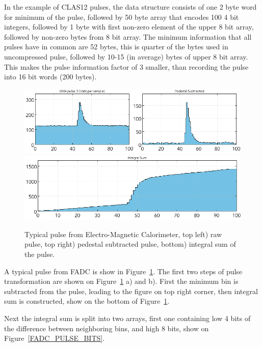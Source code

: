 \documentclass[12pt]{article}
\begin{document}
In the example of CLAS12 pulses, the data structure consists of one 2 byte word for
minimum of the pulse, followed by 50 byte array that encodes 100 4 bit integers, followed
by 1 byte with first non-zero element of the upper 8 bit array, followed by non-zero bytes
from 8 bit array. The minimum information that all pulses have in common are 52 bytes,
this is quarter of the bytes used in uncompressed pulse, followed by 10-15 (in average)
bytes of upper 8 bit array. This makes the pulse information factor of 3 smaller, than 
recording the pulse into 16 bit words (200 bytes).



\begin{figure}[!ht]
\begin{center}

 \includegraphics[width=6in]{pics/fadc_pulse_reduction.png}
 \includegraphics[width=6in]{pics/fadc_pulse_summ.png}

 \caption {Typical pulse from Electro-Magnetic Calorimeter, top left) raw pulse, top right) pedestal subtracted pulse, bottom) integral sum of the pulse.}
 \label{FADC_PULSE}
 \end{center}
\end{figure}

A typical pulse from FADC is show in Figure~\ref{FADC_PULSE}. The first two steps of
pulse transformation are shown on Figure~\ref{FADC_PULSE} a) and b). First the minimum
bin is subtracted from the pulse, leading to the figure on top right corner, then integral sum
is constructed, show on the bottom of Figure~\ref{FADC_PULSE}.

Next the integral sum is split into two arrays, first one containing low 4 bits of the
difference between neighboring bins, and high 8 bits, show on Figure~\ref{FADC_PULSE_BITS}.
\end{document}
